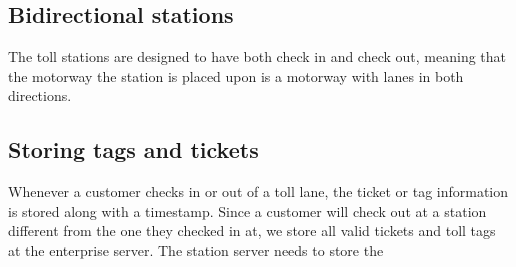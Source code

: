 \subsection{Bidirectional stations}
The toll stations are designed to have both check in and check out, meaning that the motorway the station is placed upon is a motorway with lanes in both directions.

\subsection{Storing tags and tickets}
Whenever a customer checks in or out of a toll lane, the ticket or tag information is stored along with a timestamp. Since a customer will check out at a station different from the one they checked in at, we store all valid tickets and toll tags at the enterprise server. The station server needs to store the 